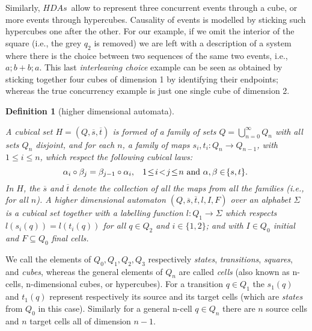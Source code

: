 \documentclass[submission,copyright,creativecommons]{eptcs}
\newtheorem{definition}[theorem]{Definition}
\newcounter{case}
\newcommand\labelH{\ensuremath{l}}
\newcommand\HDAs{\ensuremath{\mathit{HDAs}}}
\begin{document}
Similarly, \HDAs\ allow to represent three concurrent events through a cube, or more events through hypercubes. Causality of events is modelled by sticking such hypercubes one after the other. For our example, if we omit the interior of the square (i.e., the grey $q_{2}$ is removed) we are left with a description of a system where there is the choice between two sequences of the same two events, i.e., $a;b+b;a$.
This last \textit{interleaving choice} example can be seen as obtained by sticking together four cubes of dimension 1 by identifying their endpoints; whereas the true concurrency example is just one single cube of dimension 2.

\begin{definition}[higher dimensional automata]\label{def_hda}\ 

A \emph{cubical set} $H=(Q,\overline{s},\overline{t})$ is formed of a family of sets $Q=\mathop{\bigcup}_{n=0}^{\infty}Q_{n}$ with all sets $Q_{n}$ disjoint, and for each $n$, a family of maps $s_{i}, t_{i}:Q_{n}\rightarrow Q_{n-1}$, with $1\leq i\leq n$, which respect the following \emph{cubical laws}:
\begin{equation}\label{eq_cubic_laws}
\hspace{-1ex}\alpha_{i}\circ\beta_{j}=\beta_{j-1}\circ\alpha_{i},\hspace{2ex}1\!\leq\!i\!<\!j\!\leq\!n\mbox{ and }\alpha,\beta\in\!\{s,t\}.
\end{equation}
In $H$, the $\overline{s}$ and $\overline{t}$ denote the collection of all the maps from all the families (i.e., for all $n$).
A \emph{higher dimensional automaton} $(Q,\overline{s},\overline{t},\labelH,I,F)$ over an alphabet $\Sigma $ is a cubical set together with a \emph{labelling function} $\labelH:Q_{1}\rightarrow\Sigma $ which respects $\labelH(s_{i}(q))=\labelH(t_{i}(q))$ for all $q\in Q_{2}$ and $i\in\{1,2\}$; and with $I\in Q_{0}$ \emph{initial} and $F\subseteq Q_{0}$ \emph{final} cells.
\end{definition}


We call the elements of $Q_{0},Q_{1},Q_{2},Q_{3}$ respectively \textit{states}, \textit{transitions}, \textit{squares}, and \textit{cubes}, whereas the general elements of $Q_{n}$ are called \textit{cells} (also known as n-cells, n-dimensional cubes, or hypercubes).
For a transition $q\in Q_{1}$ the $s_{1}(q)$ and $t_{1}(q)$ represent respectively its source and its target cells (which are \textit{states} from $Q_{0}$ in this case). Similarly for a general n-cell $q\in Q_{n}$ there are $n$ source cells and $n$ target cells all of dimension $n-1$. 
\end{document}
